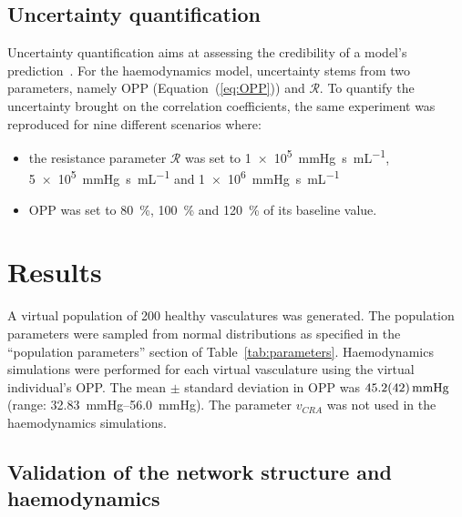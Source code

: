 \documentclass[11pt,]{article}
\begin{document}
\subsection{Uncertainty quantification}\label{sec:methods-UQ}

Uncertainty quantification aims at assessing the credibility of a model's prediction~\cite{ASME2018,Viceconti2021}.
For the haemodynamics model, uncertainty stems from two parameters, namely OPP (Equation~(\ref{eq:OPP})) and $\mathcal R$.
To quantify the uncertainty brought on the correlation coefficients, the same experiment was reproduced for nine different scenarios where:
\begin{itemize}
\item the resistance parameter $\mathcal R$ was set to \SI[per-mode=symbol]{1e5}{\mmHg\second\per\mL}, \SI[per-mode=symbol]{5e5}{\mmHg\second\per\mL} and \SI[per-mode=symbol]{1e6}{\mmHg\second\per\mL}
\item OPP was set to \SI{80}{\percent}, \SI{100}{\percent} and \SI{120}{\percent} of its baseline value.
\end{itemize}

\section{Results}\label{sec:results}

A virtual population of 200 healthy vasculatures was generated.
The population parameters were sampled from normal distributions as specified in the ``population parameters'' section of Table~\ref{tab:parameters}. %
Haemodynamics simulations were performed for each virtual vasculature using the virtual individual's OPP.
The mean $\pm$ standard deviation in OPP was $\SI{45.2 \pm 4.2}{\mmHg}$ (range: \SIrange{32.83}{56.0}{\mmHg}).
The parameter $v_{CRA}$ was not used in the haemodynamics simulations.

\subsection{Validation of the network structure and haemodynamics}\label{sec:validation}
\end{document}
